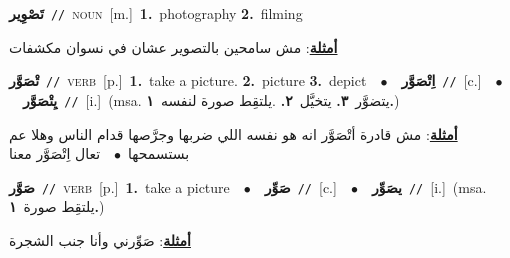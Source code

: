 \documentclass[10pt,a4paper,twoside]{article} %
\begin{document}
\begin{multicols}{2}
{\setlength\topsep{0pt}\textbf{\foreignlanguage{arabic}{تَصْوِير}}\ {\color{gray}\texttt{//}\color{black}}\ \textsc{noun}\ [m.]\ \textbf{1.}~photography  \textbf{2.}~filming\  \begin{flushright}\color{gray}\foreignlanguage{arabic}{\textbf{\underline{\foreignlanguage{arabic}{أمثلة}}}: مش سامحين بالتصوير عشان في نسوان مكشفات}\end{flushright}\color{black}} \vspace{2mm}

{\setlength\topsep{0pt}\textbf{\foreignlanguage{arabic}{تْصَوَّر}}\ {\color{gray}\texttt{//}\color{black}}\ \textsc{verb}\ [p.]\ \textbf{1.}~take a picture.  \textbf{2.}~picture  \textbf{3.}~depict\ \ $\bullet$\ \ \setlength\topsep{0pt}\textbf{\foreignlanguage{arabic}{اِتْصَوَّر}}\ {\color{gray}\texttt{//}\color{black}}\ [c.]\ \ $\bullet$\ \ \setlength\topsep{0pt}\textbf{\foreignlanguage{arabic}{يِتْصَوَّر}}\ {\color{gray}\texttt{//}\color{black}}\ [i.]\ \color{gray}(msa. \foreignlanguage{arabic}{يتضوَّر}~\foreignlanguage{arabic}{\textbf{٣.}}  \foreignlanguage{arabic}{يتخيَّل}~\foreignlanguage{arabic}{\textbf{٢.}}  .\foreignlanguage{arabic}{يلتقِط صورة لنفسه}~\foreignlanguage{arabic}{\textbf{١.}})\color{black}\  \begin{flushright}\color{gray}\foreignlanguage{arabic}{\textbf{\underline{\foreignlanguage{arabic}{أمثلة}}}: مش قادرة أتْصَوَّر انه هو نفسه اللي ضربها وجرَّصها قدام الناس وهلا عم بستسمحها\ $\bullet$\ \  تعال اِتْصَوَّر معنا}\end{flushright}\color{black}} \vspace{2mm}

{\setlength\topsep{0pt}\textbf{\foreignlanguage{arabic}{صَوَّر}}\ {\color{gray}\texttt{//}\color{black}}\ \textsc{verb}\ [p.]\ \textbf{1.}~take a picture\ \ $\bullet$\ \ \setlength\topsep{0pt}\textbf{\foreignlanguage{arabic}{صَوِّر}}\ {\color{gray}\texttt{//}\color{black}}\ [c.]\ \ $\bullet$\ \ \setlength\topsep{0pt}\textbf{\foreignlanguage{arabic}{يصَوِّر}}\ {\color{gray}\texttt{//}\color{black}}\ [i.]\ \color{gray}(msa. \foreignlanguage{arabic}{يلتقِط صورة}~\foreignlanguage{arabic}{\textbf{١.}})\color{black}\  \begin{flushright}\color{gray}\foreignlanguage{arabic}{\textbf{\underline{\foreignlanguage{arabic}{أمثلة}}}: صَوِّرني وأنا جنب الشجرة}\end{flushright}\color{black}} \vspace{2mm}


\end{multicols}
\end{document}
